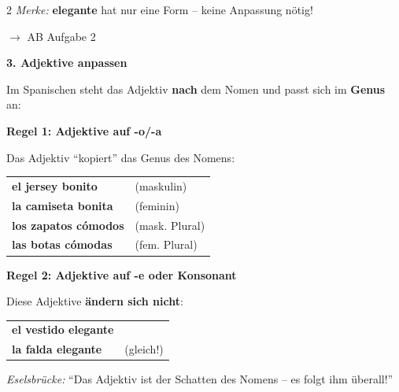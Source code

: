 \documentclass[11pt, a4paper]{article}
\newcommand{\seriftext}[1]{{\fontfamily{ppl}\selectfont #1}}
\newcommand{\es}[1]{\seriftext{\textbf{#1}}}
\newcommand{\abmark}[1]{{\footnotesize\textcolor{akzent}{$\rightarrow$ AB #1}}}
\begin{document}
\begin{multicols}{2}
\vspace{4pt}
{\footnotesize\textit{Merke:} \es{elegante} hat nur eine Form -- keine Anpassung nötig!}

\abmark{Aufgabe 2}

\columnbreak

\textbf{\large 3. Adjektive anpassen}

\vspace{4pt}

Im Spanischen steht das Adjektiv \textbf{nach} dem Nomen und passt sich im \textbf{Genus} an:

\begin{grammatikbox}
\textbf{Regel 1: Adjektive auf -o/-a}

Das Adjektiv ``kopiert'' das Genus des Nomens:

\vspace{3pt}
{\small
\begin{tabular}{@{}ll@{}}
\es{el jersey bonit\textbf{o}} & (maskulin) \\[0.3em]
\es{la camiseta bonit\textbf{a}} & (feminin) \\[0.3em]
\es{los zapatos cómod\textbf{os}} & (mask. Plural) \\[0.3em]
\es{las botas cómod\textbf{as}} & (fem. Plural) \\
\end{tabular}}
\end{grammatikbox}

\vspace{4pt}

\begin{grammatikbox}
\textbf{Regel 2: Adjektive auf -e oder Konsonant}

Diese Adjektive \textbf{ändern sich nicht}:

\vspace{3pt}
{\small
\begin{tabular}{@{}ll@{}}
\es{el vestido elegant\textbf{e}} & \\[0.3em]
\es{la falda elegant\textbf{e}} & (gleich!) \\
\end{tabular}}
\end{grammatikbox}

\vspace{4pt}
{\footnotesize\textit{Eselsbrücke:} ``Das Adjektiv ist der Schatten des Nomens -- es folgt ihm überall!''}


\end{multicols}
\end{document}

